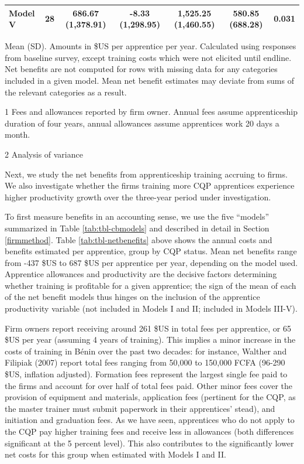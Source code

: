 \documentclass[
  11pt,
a4paper
]{report}
\begin{document}
\begin{table}[H]
{\begin{threeparttable}
\begin{tabular}[t]{lcccccc}
\hspace{1em}Model V & 28 & 686.67 (1,378.91) & -8.33 (1,298.95) & 1,525.25 (1,460.55) & 580.85 (688.28) & 0.031\\
\bottomrule
\end{tabular}
\begin{tablenotes}
\small
\item Mean (SD). Amounts in \$US per apprentice per year. Calculated using responses from baseline survey, except training costs which were not elicited until endline. Net benefits are not computed for rows with missing data for any categories included in a given model. Mean net benefit estimates may deviate from sums of the relevant categories as a result.
\item[1] Fees and allowances reported by firm owner. Annual fees assume apprenticeship duration of four years, annual allowances assume apprentices work 20 days a month.
\item[2] Analysis of variance
\end{tablenotes}
\end{threeparttable}}
\end{table}

\noindent Next, we study the net benefits from apprenticeship training accruing to firms. We also investigate whether the firms training more CQP apprentices experience higher productivity growth over the three-year period under investigation.

To first measure benefits in an accounting sense, we use the five ``models'' summarized in Table \ref{tab:tbl-cbmodels} and described in detail in Section \ref{firmmethod}. Table \ref{tab:tbl-netbenefits} above shows the annual costs and benefits estimated per apprentice, group by CQP status. Mean net benefits range from -437 \$US to 687 \$US per apprentice per year, depending on the model used. Apprentice allowances and productivity are the decisive factors determining whether training is profitable for a given apprentice; the sign of the mean of each of the net benefit models thus hinges on the inclusion of the apprentice productivity variable (not included in Models I and II; included in Models III-V).

Firm owners report receiving around 261 \$US in total fees per apprentice, or 65 \$US per year (assuming 4 years of training). This implies a minor increase in the costs of training in Bénin over the past two decades: for instance, Walther and Filipiak (2007) report total fees ranging from 50,000 to 150,000 FCFA (96-290 \$US, inflation adjusted). Formation fees represent the largest single fee paid to the firms and account for over half of total fees paid. Other minor fees cover the provision of equipment and materials, application fees (pertinent for the CQP, as the master trainer must submit paperwork in their apprentices' stead), and initiation and graduation fees. As we have seen, apprentices who do not apply to the CQP pay higher training fees and receive less in allowances (both differences significant at the 5 percent level). This also contributes to the significantly lower net costs for this group when estimated with Models I and II.
\end{document}
